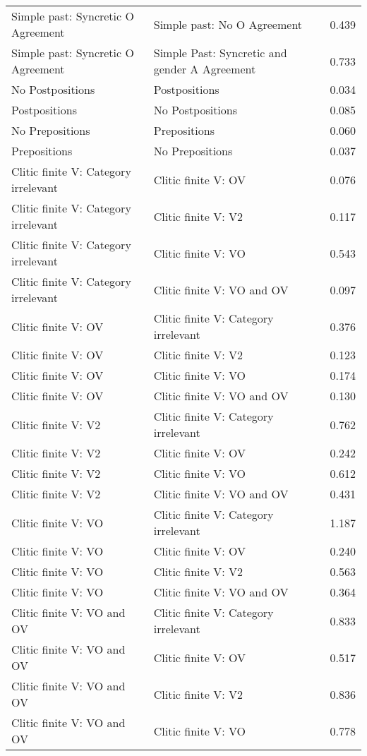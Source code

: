 \begin{longtable}{p{.4\linewidth}p{.4\linewidth}p{.1\linewidth}}
Simple past: Syncretic O Agreement & Simple past: No O Agreement & 0.439\\
Simple past: Syncretic O Agreement & Simple Past: Syncretic and gender A Agreement & 0.733\\
No Postpositions & Postpositions & 0.034\\
Postpositions & No Postpositions & 0.085\\
No Prepositions & Prepositions & 0.060\\
Prepositions & No Prepositions & 0.037\\
Clitic finite V: Category irrelevant & Clitic finite V: OV & 0.076\\
Clitic finite V: Category irrelevant & Clitic finite V: V2 & 0.117\\
Clitic finite V: Category irrelevant & Clitic finite V: VO & 0.543\\
Clitic finite V: Category irrelevant & Clitic finite V: VO and OV & 0.097\\
Clitic finite V: OV & Clitic finite V: Category irrelevant & 0.376\\
Clitic finite V: OV & Clitic finite V: V2 & 0.123\\
Clitic finite V: OV & Clitic finite V: VO & 0.174\\
Clitic finite V: OV & Clitic finite V: VO and OV & 0.130\\
Clitic finite V: V2 & Clitic finite V: Category irrelevant & 0.762\\
Clitic finite V: V2 & Clitic finite V: OV & 0.242\\
Clitic finite V: V2 & Clitic finite V: VO & 0.612\\
Clitic finite V: V2 & Clitic finite V: VO and OV & 0.431\\
Clitic finite V: VO & Clitic finite V: Category irrelevant & 1.187\\
Clitic finite V: VO & Clitic finite V: OV & 0.240\\
Clitic finite V: VO & Clitic finite V: V2 & 0.563\\
Clitic finite V: VO & Clitic finite V: VO and OV & 0.364\\
Clitic finite V: VO and OV & Clitic finite V: Category irrelevant & 0.833\\
Clitic finite V: VO and OV & Clitic finite V: OV & 0.517\\
Clitic finite V: VO and OV & Clitic finite V: V2 & 0.836\\
Clitic finite V: VO and OV & Clitic finite V: VO & 0.778\\

\end{longtable}
